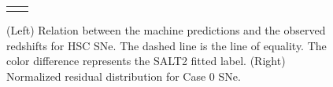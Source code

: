 \documentclass[useamsfonts]{pasj01}
\begin{document}
\begin{figure}[htbp]
\begin{tabular}{cc}
\begin{minipage}{0.5\hsize}
\begin{center}
            \end{center}
        \end{minipage}
    \end{tabular}  \caption{%
    (Left) Relation between the machine predictions and the observed redshifts for HSC SNe.
    The dashed line is the line of equality.
    The color difference represents the SALT2 fitted label.
    (Right) Normalized residual distribution for Case 0 SNe.
    }%
    \label{fig:redshift_estimation}
\end{figure}

%


%
\end{document}
